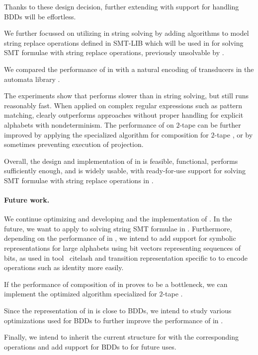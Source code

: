 Thanks to these design decision, further extending \mata with support for handling BDDs will be effortless.

We further focussed on utilizing \nfts in string solving by adding algorithms to model string replace operations defined in SMT-LIB which will be used in \noodler for solving SMT formulae with string replace operations, previously unsolvable by \noodler.

We compared the performance of \nfts in \mata with a natural encoding of transducers in the automata library \mona.

The experiments show that \mata performs slower than \mona in string solving, but still runs reasonably fast.
When applied on complex regular expressions such as pattern matching, \mata clearly outperforms approaches without proper handling for explicit alphabets with nondeterminism.
The performance of \mata on $2$-tape \nfts can be further improved by applying the specialized algorithm for composition for $2$-tape \nfts, or by sometimes preventing execution of projection.

Overall, the design and implementation of \nfts in \mata is feasible, functional, performs sufficiently enough, and is widely usable, with ready-for-use support for solving SMT formulae with string replace operations in \noodler.

\paragraph{Future work.}
We continue optimizing and developing \mata and the implementation of \nfts.
In the future, we want to apply \nfts to solving string SMT formulae in \noodler.
Furthermore, depending on the performance of \nfts in \noodler, we intend to add support for symbolic representations for large alphabets using bit vectors representing sequences of bits, as used in tool \lash~cite{lash} and transition representation specific to \nfts to encode \nft operations such as identity more easily.

If the performance of composition of \nfts in \noodler proves to be a bottleneck, we can implement the optimized algorithm specialized for $2$-tape \nfts.

Since the representation of \nfts in \mata is close to BDDs, we intend to study various optimizations used for BDDs to further improve the performance of \nfts in \mata.

Finally, we intend to inherit the current structure for \nfts with the corresponding operations and add support for BDDs to \mata for future uses.



% 
